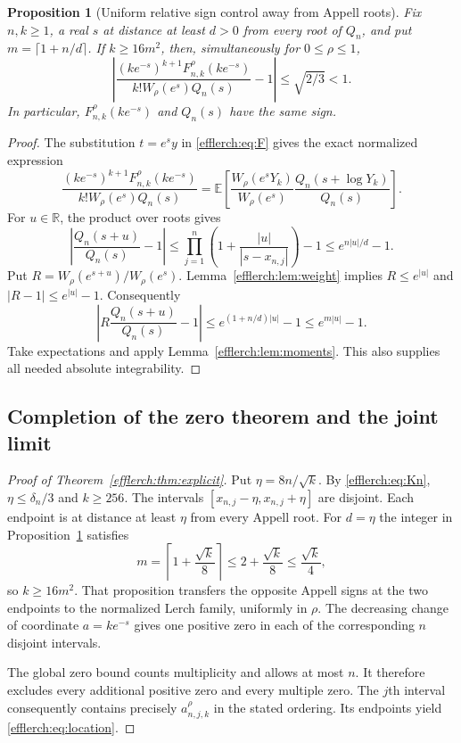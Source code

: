 \documentclass[11pt,letterpaper]{article}
\newtheorem{proposition}[theorem]{Proposition}
\theoremstyle{definition}
\theoremstyle{remark}
\begin{document}
\begin{proposition}[Uniform relative sign control away from Appell roots]
\label{efflerch:prop:sign}
Fix $n,k\geq1$, a real $s$ at distance at least $d>0$ from every
root of $Q_n$, and put $m=\lceil1+n/d\rceil$.
If $k\geq16m^2$, then, simultaneously for $0\leq\rho\leq1$,
\begin{equation}\label{efflerch:eq:relative}
 \left|
  \frac{(ke^{-s})^{k+1}F_{n,k}^\rho(ke^{-s})}
       {k! W_\rho(e^s)Q_n(s)}-1
 \right|\leq\sqrt{2/3}<1.
\end{equation}
In particular, $F_{n,k}^\rho(ke^{-s})$ and $Q_n(s)$ have the same sign.
\end{proposition}
\begin{proof}
The substitution $t=e^s y$ in \eqref{efflerch:eq:F} gives the exact
normalized expression
\[
 \frac{(ke^{-s})^{k+1}F_{n,k}^\rho(ke^{-s})}
      {k!W_\rho(e^s)Q_n(s)}
 =\mathbb E\left[
  \frac{W_\rho(e^sY_k)}{W_\rho(e^s)}
  \frac{Q_n(s+\log Y_k)}{Q_n(s)}\right].
\]
For $u\in\mathbb R$, the product over roots gives
\[
 \left|\frac{Q_n(s+u)}{Q_n(s)}-1\right|
  \leq\prod_{j=1}^n\left(1+\frac{|u|}{|s-x_{n,j}|}\right)-1
  \leq e^{n|u|/d}-1.
\]
Put $R=W_\rho(e^{s+u})/W_\rho(e^s)$.  Lemma~\ref{efflerch:lem:weight}
implies $R\leq e^{|u|}$ and $|R-1|\leq e^{|u|}-1$.
Consequently
\[
 \left|R\frac{Q_n(s+u)}{Q_n(s)}-1\right|
  \leq e^{(1+n/d)|u|}-1\leq e^{m|u|}-1.
\]
Take expectations and apply Lemma~\ref{efflerch:lem:moments}.
This also supplies all needed absolute integrability.
\end{proof}

\subsection{Completion of the zero theorem and the joint limit}

\begin{proof}[Proof of Theorem~\ref{efflerch:thm:explicit}]
Put $\eta=8n/\sqrt{k}$.  By \eqref{efflerch:eq:Kn},
$\eta\leq\delta_n/3$ and $k\geq256$.
The intervals $[x_{n,j}-\eta,x_{n,j}+\eta]$ are disjoint.
Each endpoint is at distance at least $\eta$ from every Appell root.
For $d=\eta$ the integer in Proposition~\ref{efflerch:prop:sign} satisfies
\[
 m=\left\lceil1+\frac{\sqrt{k}}8\right\rceil
  \leq2+\frac{\sqrt{k}}8\leq\frac{\sqrt{k}}4,
\]
so $k\geq16m^2$.  That proposition transfers the opposite Appell
signs at the two endpoints to the normalized Lerch family, uniformly
in $\rho$.  The decreasing change of coordinate $a=ke^{-s}$ gives
one positive zero in each of the corresponding $n$ disjoint intervals.

The global zero bound counts multiplicity and allows at most $n$.
It therefore excludes every additional positive zero and every
multiple zero.  The $j$th interval consequently contains precisely
$a_{n,j,k}^\rho$ in the stated ordering.  Its endpoints yield
\eqref{efflerch:eq:location}.
\end{proof}
\end{document}

